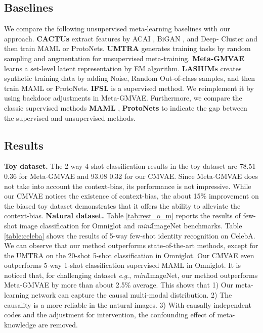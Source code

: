\documentclass[letterpaper]{article} \usepackage{aaai23}  \usepackage{times}  \usepackage{helvet}  \usepackage{courier}  \usepackage[hyphens]{url}  \usepackage{graphicx} \urlstyle{rm} \def\UrlFont{\rm}  \usepackage{natbib}  \usepackage{caption} \frenchspacing  \setlength{\pdfpagewidth}{8.5in}  \setlength{\pdfpageheight}{11in}  \usepackage{algorithm}
\newcommand{\eg}{\textit{e}.\textit{g}.}
\theoremstyle{plain}
\theoremstyle{definition}
\theoremstyle{remark}
\begin{document}
\subsection{Baselines} 
We compare the following unsupervised meta-learning baselines with our approach.  \textbf{CACTUs} \cite{hsu2018unsupervised} extract features by ACAI \cite{berthelot2019understanding}, BiGAN \cite{Donahue2017adversarial}, and Deep-
Cluster \cite{caron2018deep} and then train MAML or ProtoNets. \textbf{UMTRA} \cite{khodadadeh2018unsupervised} generates training tasks by random sampling and augmentation for unsupervised meta-training. \textbf{Meta-GMVAE} \cite{lee2021metagmvae} learns a set-level latent representation by EM algorithm. \textbf{LASIUMs} \cite{khodadadeh2021unsupervised} creates synthetic training data by adding Noise, Random Out-of-class samples, and then train MAML or ProtoNets. \textbf{IFSL} \cite{yue2020inter} is a supervised method. We reimplement it by using backdoor adjustments in Meta-GMVAE. Furthermore, we compare the classic supervised methods  \textbf{MAML} \cite {finn2017model}, \textbf{ProtoNets} \cite{snellPrototypicalNetworksFewshot2017} to indicate the gap between the supervised and unsupervised methods.



\subsection{Results}


\textbf{Toy dataset.}
The 2-way 4-shot classification results in the toy dataset are 78.51  0.36 for Meta-GMVAE and 93.08  0.32 for our CMVAE. Since Meta-GMVAE does not take into account the context-bias, its performance is not impressive. While our CMVAE notices the existence of context-bias, the about 15\% improvement on the biased toy dataset demonstrates that it offers the ability to alleviate the context-bias.
\textbf{Natural dataset.}
Table \ref{tab:rest_o_m}  reports the results of few-shot image classification for Omniglot and \textit{mini}ImageNet benchmarks. Table \ref{table:celeba} shows the results of 5-way few-shot identity recognition on CelebA. We can observe that our method outperforms state-of-the-art methods, except for the UMTRA on the 20-shot 5-shot classification in Omniglot. Our CMVAE even outperforms 5-way 1-shot classification supervised MAML in Omniglot. It is noticed that, for challenging dataset \eg, \textit{mini}ImageNet, our method outperforms Meta-GMVAE by more than about 2.5\% average. This shows that 1) Our meta-learning network can capture the causal multi-modal distribution. 2) The causality is a more reliable in the natural images. 3) With causally independent codes and the adjustment for intervention, the confounding effect of meta-knowledge are removed.
\end{document}
